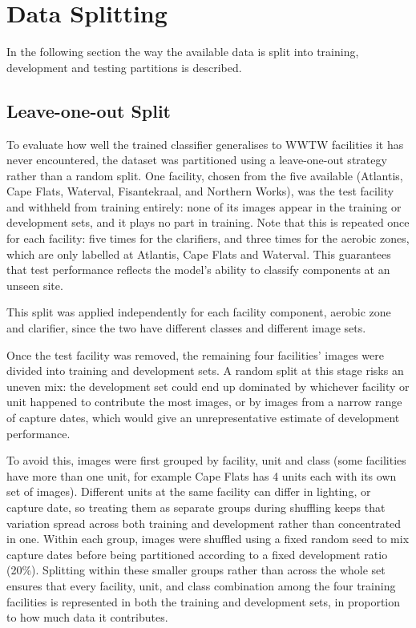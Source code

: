 \section{Data Splitting}
In the following section the way the available data is split into training, development and testing partitions is described.

\subsection{Leave-one-out Split}

To evaluate how well the trained classifier generalises to WWTW facilities it has never encountered, the dataset was partitioned using a leave-one-out strategy rather than a random split. One facility, chosen from the five available (Atlantis, Cape Flats, Waterval, Fisantekraal, and Northern Works), was the test facility and withheld from training entirely: none of its images appear in the training or development sets, and it plays no part in training. Note that this is repeated once for each facility: five times for the clarifiers, and three times for the aerobic zones, which are only labelled at Atlantis, Cape Flats and Waterval. This guarantees that test performance reflects the model's ability to classify components at an unseen site.

This split was applied independently for each facility component, aerobic zone and clarifier, since the two have different classes and different image sets.

Once the test facility was removed, the remaining four facilities' images were divided into training and development sets. A random split at this stage risks an uneven mix: the development set could end up dominated by whichever facility or unit happened to contribute the most images, or by images from a narrow range of capture dates, which would give an unrepresentative estimate of development performance.

To avoid this, images were first grouped by facility, unit and class (some facilities have more than one unit, for example Cape Flats has 4 units each with its own set of images). Different units at the same facility can differ in lighting, or capture date, so treating them as separate groups during shuffling keeps that variation spread across both training and development rather than concentrated in one. Within each group, images were shuffled using a fixed random seed to mix capture dates before being partitioned according to a fixed development ratio (20\%). Splitting within these smaller groups rather
than across the whole set ensures that every facility, unit, and class combination among the four training facilities is represented in both
the training and development sets, in proportion to how much data it contributes.



